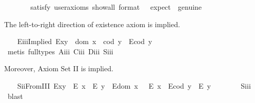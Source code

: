 \begin{isabellebody}
{}
\ \isanewline
\ \ \ \ \isamarkupfalse%
\ {\isacharbrackleft}satisfy{\isacharcomma}\ user{\isacharunderscore}axioms{\isacharcomma}\ show{\isacharunderscore}all{\isacharcomma}\ format\ {\isacharequal}\ {}{\isacharcomma}\ expect\ {\isacharequal}\ genuine{\isacharbrackright}%
\isadelimproof
\ %
\endisadelimproof
%
\isatagproof
{}\isamarkupfalse%
%
\endisatagproof
{\isafoldproof}%
%
\isadelimproof
%
\endisadelimproof
%
\begin{isamarkuptext}%
The left-to-right direction of existence axiom  is implied.%
\end{isamarkuptext}\isamarkuptrue%
\ \ \isamarkupfalse%
\ E\isactrlsub i\isactrlsub i\isactrlsub iImplied{\isacharcolon}\ {\isachardoublequoteopen}E{\isacharparenleft}x{\isasymcdot}y{\isacharparenright}\ \isactrlbold {\isasymrightarrow}\ {\isacharparenleft}dom\ x\ {\isasymcong}\ cod\ y\ \isactrlbold {\isasymand}\ E{\isacharparenleft}cod\ y{\isacharparenright}{\isacharparenright}{\isachardoublequoteclose}\ \isanewline
%
\isadelimproof
\ \ \ \ %
\endisadelimproof
%
\isatagproof
{}\isamarkupfalse%
\ {\isacharparenleft}metis\ {\isacharparenleft}full{\isacharunderscore}types{\isacharparenright}\ A\isactrlsub i\isactrlsub i\isactrlsub i\ C\isactrlsub i\isactrlsub i\isactrlsub i\ D\isactrlsub i\isactrlsub i\isactrlsub i\ S\isactrlsub i\isactrlsub i\isactrlsub i{\isacharparenright}%
\endisatagproof
{\isafoldproof}%
%
\isadelimproof
%
\endisadelimproof
%
\begin{isamarkuptext}%
Moreover, Axiom Set II is implied.%
\end{isamarkuptext}\isamarkuptrue%
\ \ \isamarkupfalse%
\ S\isactrlsub i\isactrlsub iFromIII{\isacharcolon}\ {\isachardoublequoteopen}{\isacharparenleft}E{\isacharparenleft}x{\isasymcdot}y{\isacharparenright}\ \isactrlbold {\isasymrightarrow}\ {\isacharparenleft}E\ x\ \isactrlbold {\isasymand}\ E\ y{\isacharparenright}{\isacharparenright}\ \isactrlbold {\isasymand}\ {\isacharparenleft}E{\isacharparenleft}dom\ x\ {\isacharparenright}\ \isactrlbold {\isasymrightarrow}\ E\ x{\isacharparenright}\ \isactrlbold {\isasymand}\ {\isacharparenleft}E{\isacharparenleft}cod\ y{\isacharparenright}\ \isactrlbold {\isasymrightarrow}\ E\ y{\isacharparenright}{\isachardoublequoteclose}\ \ \isanewline
%
\isadelimproof
\ \ \ \ %
\endisadelimproof
%
\isatagproof
{}\isamarkupfalse%
\ S\isactrlsub i\isactrlsub i\isactrlsub i\ \isamarkupfalse%
\ blast%
\endisatagproof

\end{isabellebody}

